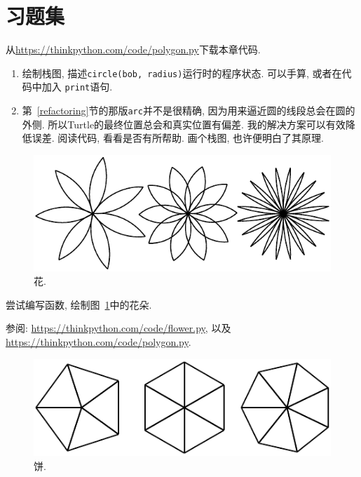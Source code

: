 \documentclass[10pt]{book}
\begin{document}
\section{习题集}

\begin{exercise}

从\url{https://thinkpython.com/code/polygon.py}下载本章代码. 

\begin{enumerate}

\item 绘制栈图, 描述{\tt circle(bob, radius)}运行时的程序状态. 
可以手算, 或者在代码中加入 {\tt print}语句.

\item 第~\ref{refactoring}节的那版{\tt arc}并不是很精确, 
因为用来逼近圆的线段总会在圆的外侧. 
所以Turtle的最终位置总会和真实位置有偏差. 
我的解决方案可以有效降低误差. 阅读代码, 看看是否有所帮助. 
画个栈图, 也许便明白了其原理. 

\end{enumerate}

\end{exercise}

\begin{figure}
\centerline
{\includegraphics[scale=0.8]{figs/flowers.pdf}}
\caption{花.}
\label{fig.flowers}
\end{figure}

\begin{exercise}

尝试编写函数, 绘制图~\ref{fig.flowers}中的花朵. 

参阅: \url{https://thinkpython.com/code/flower.py},
以及 \url{https://thinkpython.com/code/polygon.py}.

\end{exercise}

\begin{figure}
\centerline
{\includegraphics[scale=0.8]{figs/pies.pdf}}
\caption{饼.}
\label{fig.pies}
\end{figure}
\end{document}
